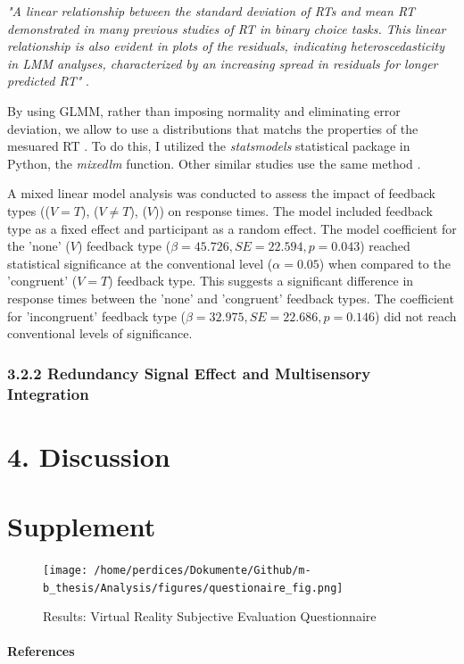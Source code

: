 \documentclass[12pt,oneside,openright]{report}
\begin{document}
\textit{"A linear relationship between the standard deviation of RTs and mean RT demonstrated in many previous studies of RT in binary choice tasks. This linear relationship is also evident in plots of the residuals, indicating heteroscedasticity in LMM analyses, characterized by an increasing spread in residuals for longer predicted RT"} \parencite{Lo2015-fv}.

By using GLMM, rather than imposing normality and eliminating error deviation, we allow to use a distributions that matchs the properties of the mesuared RT \parencite{Lo2015-fv}. To do this, I utilized the \textit{statsmodels} statistical package in Python, the \textit{mixedlm} function. Other similar studies use the same method \parencite{RSE_FBI}.

A mixed linear model analysis was conducted to assess the impact of feedback types (($V=T$), ($V \neq T$), ($V$)) on response times. The model included feedback type as a fixed effect and participant as a random effect. The model coefficient for the 'none' ($V$) feedback type ($\beta = 45.726, SE = 22.594, p = 0.043$) reached statistical significance at the conventional level ($\alpha =0.05 $) when compared to the 'congruent' ($V=T$) feedback type. This suggests a significant difference in response times between the 'none' and 'congruent' feedback types. The coefficient for 'incongruent' feedback type ($\beta = 32.975, SE = 22.686, p = 0.146$) did not reach conventional levels of significance. 

\subsubsection*{3.2.2 Redundancy Signal Effect and Multisensory Integration}



\section*{4. Discussion}

\pagebreak

\newpage



\section*{Supplement}
    \begin{figure}[H]
        \centering
        \texttt{[image: /home/perdices/Dokumente/Github/m-b\_thesis/Analysis/figures/questionaire\_fig.png]}
        \caption{Results: Virtual Reality Subjective Evaluation Questionnaire}
        \label{fig:quest}
    \end{figure}
  

\pagebreak
\paragraph{\textbf{References}}
\printbibliography[heading=none]
\end{document}
